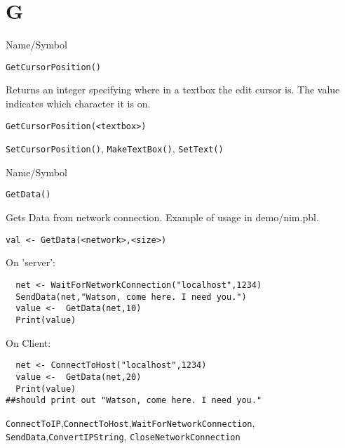 \rl
\section{G}
\rl


\begin{desc}{Name/Symbol}
\item[Name/Symbol]	\verb+GetCursorPosition()+

\item[Description]	Returns an integer specifying where in a textbox the edit cursor is.  The value indicates which character it is on.

\item[Usage]
\begin{verbatim}
GetCursorPosition(<textbox>)
\end{verbatim}

\item[Example]	

\item[See Also]	\verb+SetCursorPosition()+, \verb+MakeTextBox()+, \verb+SetText()+
\end{desc}

\rl


\begin{desc}{Name/Symbol}
\item[Name/Symbol]	\verb+GetData()+

\item[Description]	Gets Data from network connection.  Example of
  usage in demo/nim.pbl.

\item[Usage]
\begin{verbatim}
val <- GetData(<network>,<size>)
\end{verbatim}

\item[Example]	

On 'server':
\begin{verbatim}
  net <- WaitForNetworkConnection("localhost",1234)
  SendData(net,"Watson, come here. I need you.")
  value <-  GetData(net,10)
  Print(value)

\end{verbatim}
On Client:
\begin{verbatim}
  net <- ConnectToHost("localhost",1234)
  value <-  GetData(net,20)
  Print(value)
##should print out "Watson, come here. I need you."
\end{verbatim}
\item[See Also]
  \verb+ConnectToIP+,\verb+ConnectToHost+,\verb+WaitForNetworkConnection+,
   \verb+SendData+,\verb+ConvertIPString+, \verb+CloseNetworkConnection+
\end{desc}

